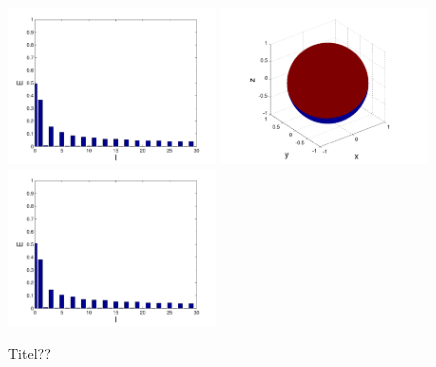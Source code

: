 \begin{refsection}
\begin{figure}
\includegraphics[width=0.49\textwidth]{kugel/kSpektrum/Kugel_3_2.pdf}
\includegraphics[width=0.49\textwidth]{kugel/kSpektrum/Kugel_4_1.pdf}
\includegraphics[width=0.49\textwidth]{kugel/kSpektrum/Kugel_4_2.pdf}
\caption{Titel??
\label{skript:Spektrum1}}
\end{figure}


\end{refsection}
